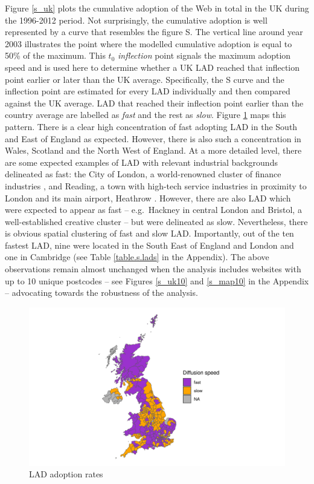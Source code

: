 \documentclass[
  authoryear,
  preprint,
  3p]{elsarticle}
\begin{document}
Figure \ref{s_uk} plots the cumulative adoption of the Web in total in
the UK during the 1996-2012 period. Not surprisingly, the cumulative
adoption is well represented by a curve that resembles the figure S. The
vertical line around year 2003 illustrates the point where the modelled
cumulative adoption is equal to 50\% of the maximum. This \(t_0\)
\emph{inflection} point signals the maximum adoption speed and is used
here to determine whether a UK LAD reached that inflection point earlier
or later than the UK average. Specifically, the S curve and the
inflection point are estimated for every LAD individually and then
compared against the UK average. LAD that reached their inflection point
earlier than the country average are labelled as \emph{fast} and the
rest as \emph{slow}. Figure \ref{s_map} maps this pattern. There is a
clear high concentration of fast adopting LAD in the South and East of
England as expected. However, there is also such a concentration in
Wales, Scotland and the North West of England. At a more detailed level,
there are some expected examples of LAD with relevant industrial
backgrounds delineated as fast: the City of London, a world-renowned
cluster of finance industries \citep{cook2007role}, and Reading, a town
with high-tech service industries in proximity to London and its main
airport, Heathrow \citep{england2005polynet}. However, there are also
LAD which were expected to appear as fast -- e.g.~Hackney in central
London and Bristol, a well-established creative cluster
\citep{oatley1999cultural, bassett2002cultural} -- but were delineated
as slow. Nevertheless, there is obvious spatial clustering of fast and
slow LAD. Importantly, out of the ten fastest LAD, nine were located in
the South East of England and London and one in Cambridge (see Table
\ref{table.s.lads} in the Appendix). The above observations remain
almost unchanged when the analysis includes websites with up to 10
unique postcodes -- see Figures \ref{s_uk10} and \ref{s_map10} in the
Appendix -- advocating towards the robustness of the analysis.

\begin{figure}[H]

{\centering \includegraphics[width=1\textwidth,height=\textheight]{../../outputs/s/speed_map.png}

}

\caption{\label{s_map}LAD adoption rates}

\end{figure}%
\end{document}
